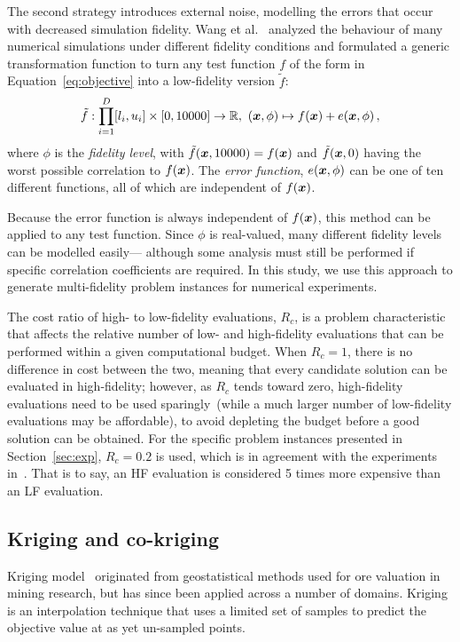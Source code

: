The second strategy introduces external noise, modelling the errors that occur with decreased simulation fidelity. Wang et al.~\cite{wang2017generic} analyzed the behaviour of many numerical simulations under different fidelity conditions and formulated a generic transformation function to turn any test function $f$ of the form in Equation~\ref{eq:objective} into a low-fidelity version $\tilde f$:
\begin{equation}
\tilde f: \displaystyle\prod^D_{i=1}[l_i,u_i] \times [0,10000] \to \mathbb{R},\ (\V{x},\phi) \mapsto f(\V{x}) + e(\V{x},\phi)\,,\label{eq:error-fn}
\end{equation}
where $\phi$ is the \emph{fidelity level}, with $\tilde f(\boldsymbol{x},10000) = f(\boldsymbol{x})$ and $\tilde f(\boldsymbol{x},0)$ having the worst possible correlation to $f(\boldsymbol{x})$. The \emph{error function}, $e(\boldsymbol{x},\phi)$ can be one of ten different functions, all of which are independent of $f(\boldsymbol{x})$.

Because the error function is always independent of $f(\boldsymbol{x})$, this method can be applied to any test function. Since $\phi$ is real-valued, many different fidelity levels can be modelled easily--- although some analysis must still be performed if specific correlation coefficients are required. In this study, we use this approach to generate multi-fidelity problem instances for numerical experiments. 

The cost ratio of high- to low-fidelity evaluations, $R_c$, is a problem characteristic that affects the relative number of low- and high-fidelity evaluations that can be performed within a given computational budget. When $R_c=1$, there is no difference in cost between the two, meaning that every candidate solution can be evaluated in high-fidelity; however, as $R_c$ tends toward zero, high-fidelity evaluations need to be used sparingly~(while a much larger number of low-fidelity evaluations may be affordable), to avoid depleting the budget before a good solution can be obtained. For the specific problem instances presented in Section~\ref{sec:exp}, $R_c=0.2$ is used, which is in agreement with the experiments in~\cite{lv2021multi}. That is to say, an HF evaluation is considered 5 times more expensive than an LF evaluation.

\subsection{Kriging and co-kriging}
Kriging model~\cite{forrester2008engineering} originated from geostatistical methods used for ore valuation in mining research, but has since been applied across a number of domains. Kriging is an interpolation technique that uses a limited set of samples to predict the objective value at as yet un-sampled points.

